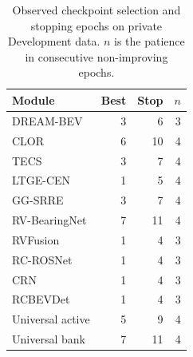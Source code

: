 \begin{table}[!ht]
\centering
\caption{Observed checkpoint selection and stopping epochs on private Development data. $n$ is the patience in consecutive non-improving epochs.}
\label{tab:convergence-stops}
\small
\setlength{\tabcolsep}{4pt}
\renewcommand{\arraystretch}{0.9}
\begin{tabular}{lrrr}
\toprule
Module & Best & Stop & $n$ \\
\midrule
DREAM-BEV & 3 & 6 & 3 \\
CLOR & 6 & 10 & 4 \\
TECS & 3 & 7 & 4 \\
LTGE-CEN & 1 & 5 & 4 \\
GG-SRRE & 3 & 7 & 4 \\
RV-BearingNet & 7 & 11 & 4 \\
RVFusion & 1 & 4 & 3 \\
RC-ROSNet & 1 & 4 & 3 \\
CRN & 1 & 4 & 3 \\
RCBEVDet & 1 & 4 & 3 \\
Universal active & 5 & 9 & 4 \\
Universal bank & 7 & 11 & 4 \\
\bottomrule
\end{tabular}
\end{table}
